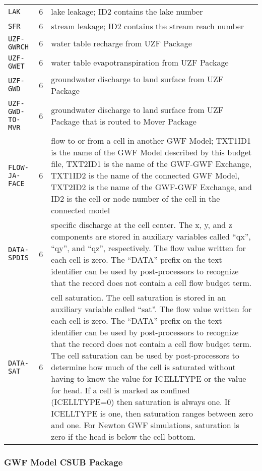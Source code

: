 \begin{longtable}{p{3.5cm} p{2cm} p{9cm}}
\texttt{LAK} & 6 & lake leakage; ID2 contains the lake number \\
\texttt{SFR} & 6 & stream leakage; ID2 contains the stream reach number \\
\texttt{UZF-GWRCH} & 6 & water table recharge from UZF Package \\
\texttt{UZF-GWET} & 6 & water table evapotranspiration from UZF Package  \\
\texttt{UZF-GWD} & 6 & groundwater discharge to land surface from UZF Package \\
\texttt{UZF-GWD-TO-MVR} & 6 & groundwater discharge to land surface from UZF Package that is routed to Mover Package\\
\texttt{FLOW-JA-FACE} & 6 & flow to or from a cell in another GWF Model; TXT1ID1 is the name of the GWF Model described by this budget file, TXT2ID1 is the name of the GWF-GWF Exchange, TXT1ID2 is the name of the connected GWF Model, TXT2ID2 is the name of the GWF-GWF Exchange, and ID2 is the cell or node number of the cell in the connected model \\
\texttt{DATA-SPDIS} & 6 & specific discharge at the cell center.  The x, y, and z components are stored in auxiliary variables called ``qx'', ``qy'', and ``qz'', respectively.   The flow value written for each cell is zero.  The ``DATA'' prefix on the text identifier can be used by post-processors to recognize that the record does not contain a cell flow budget term. \\
\texttt{DATA-SAT} & 6 & cell saturation.  The cell saturation is stored in an auxiliary variable called ``sat''.   The flow value written for each cell is zero.  The ``DATA'' prefix on the text identifier can be used by post-processors to recognize that the record does not contain a cell flow budget term.  The cell saturation can be used by post-processors to determine how much of the cell is saturated without having to know the value for ICELLTYPE or the value for head.  If a cell is marked as confined (ICELLTYPE=0) then saturation is always one.  If ICELLTYPE is one, then saturation ranges between zero and one.  For Newton GWF simulations, saturation is zero if the head is below the cell bottom.
\label{table:gwfbud}
\end{longtable}

\newpage
\subsubsection{GWF Model CSUB Package}

